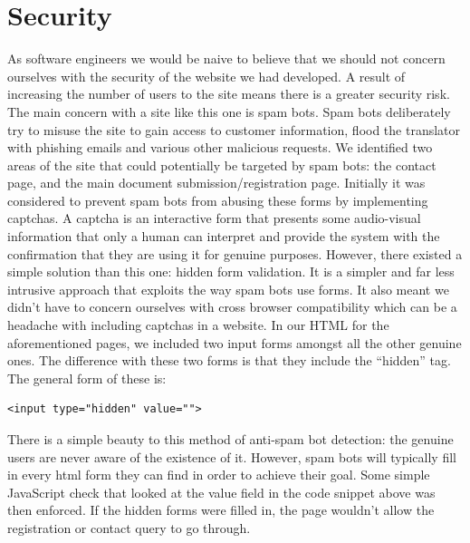 \documentclass{l3proj}
\begin{document}
\section{Security}
As software engineers we would be naive to believe that we should not concern ourselves with the
security of the website we had developed. A result of increasing the number of users to the site
means there is a greater security risk. The main concern with a site like this one is spam bots.
Spam bots deliberately try to misuse the site to gain access to customer information, flood the 
translator with phishing emails and various other malicious requests.\newline
We identified two areas of the site that could potentially be targeted by spam bots: the contact
page, and the main document submission/registration page. Initially it was considered to prevent 
spam bots from abusing these forms by implementing captchas. A captcha is an interactive form that
presents some audio-visual information that only a human can interpret and provide the system with 
the confirmation that they are using it for genuine purposes. However, there existed a simple 
solution than this one: hidden form validation. It is a simpler and far less intrusive approach that
exploits the way spam bots use forms. It also meant we didn't have to concern ourselves with 
cross browser compatibility which can be a headache with including captchas in a website. In our HTML
for the aforementioned pages, we included two input forms amongst all the other genuine ones. The 
difference with these two forms is that they include the ``hidden'' tag. The general form of these is:
\begin{lstlisting} 
<input type="hidden" value="">
\end{lstlisting}
There is a simple beauty to this method of anti-spam bot detection: the genuine users are never aware of the
existence of it. However, spam bots will typically fill in every html form they can find in order
to achieve their goal. Some simple JavaScript check that looked at the value field in the code snippet above
was then enforced. If the hidden forms were filled in, the page wouldn't allow the registration or contact 
query to go through. 
\end{document}
